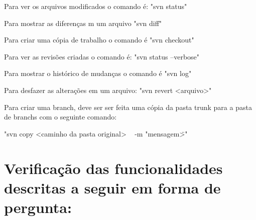 Para ver os arquivos modificados o comando é: "svn status"

Para mostrar as diferenças m um arquivo "svn diff"

Para criar uma cópia de trabalho o comando é "svn checkout"

Para ver as revisões criadas o comando é: "svn status --verbose"

Para mostrar o histórico de mudanças o comando é "svn log"

Para desfazer as alterações em um arquivo: "svn revert <arquivo>"

Para criar uma branch, deve ser ser feita uma cópia da pasta trunk para a pasta de branchs com o seguinte comando:

"svn copy <caminho da pasta original> \ <caminho da pasta de destino, essa pasta deve possuir o nome da branch> -m "mensagem\">"

\section{Verificação das funcionalidades descritas a seguir em forma de pergunta:}

